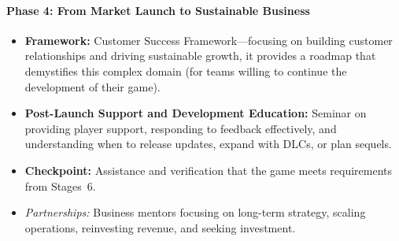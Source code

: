 \paragraph{\large Phase 4: From Market Launch to Sustainable Business}
\begin{itemize}
    \item \textbf{Framework:} Customer Success Framework---focusing on building customer relationships and driving sustainable growth, it provides a roadmap that demystifies this complex domain (for teams willing to continue the development of their game).
    \item \textbf{Post-Launch Support and Development Education:} Seminar on providing player support, responding to feedback effectively, and understanding when to release updates, expand with DLCs, or plan sequels.
    \item \textbf{Checkpoint:} Assistance and verification that the game meets requirements from Stages~6.
    \item \textit{Partnerships:} Business mentors focusing on long-term strategy, scaling operations, reinvesting revenue, and seeking investment.
\end{itemize}
